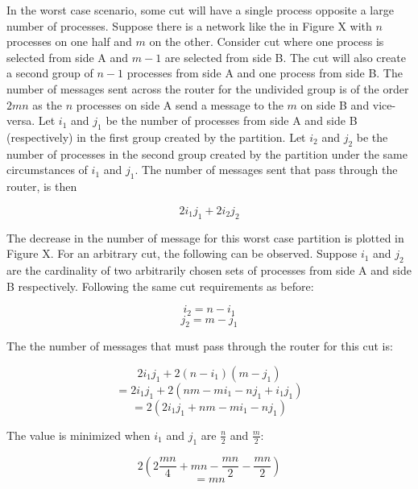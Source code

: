 In the worst case scenario, some cut will have a single process opposite a large number of processes.
Suppose there is a network like the in Figure X with $n$ processes on one half and $m$ on the other.
Consider cut where one process is selected from side A and $m-1$ are selected from side B.
The cut will also create a second group of $n-1$ processes from side A and one process from side B.
The number of messages sent across the router for the undivided group is of the order $2mn$ as the $n$ processes on side A send a message to the $m$ on side B and vice-versa.
Let $i_{1}$ and $j_{1}$ be the number of processes from side A and side B (respectively) in the first group created by the partition.
Let $i_{2}$ and $j_{2}$ be the number of processes in the second group created by the partition under the same circumstances of $i_1$ and $j_1$.
The number of messages sent that pass through the router, is then 

\begin{equation}
2 i_{1} j_{1} + 2 i_{2} j_{2}
\end{equation}

The decrease in the number of message for this worst case partition is plotted in Figure X.
For an arbitrary cut, the following can be observed.
Suppose $i_{1}$ and $j_{2}$ are the cardinality of two arbitrarily chosen sets of processes from side A and side B respectively.
Following the same cut requirements as before:

\begin{equation}
i_2 = n - i_1
\end{equation}
\begin{equation}
j_2 = m - j_1
\end{equation}

The the number of messages that must pass through the router for this cut is:

\begin{equation}
2 i_{1} j_{1} + 2 (n-i_{1}) (m-j_{1})
\end{equation}
\begin{equation}
= 2 i_{1} j_{1} + 2 (nm - mi_{1} - nj_{1} + i_{1}j_{1})
\end{equation}
\begin{equation}
= 2 (2 i_{1} j_{1} + nm - mi_{1} - nj_{1})
\end{equation}

The value is minimized when $i_1$ and $j_1$ are $\frac{n}{2}$ and $\frac{m}{2}$:

\begin{equation}
2( 2 \frac{mn}{4} + mn - \frac{mn}{2} - \frac{mn}{2})
\end{equation}
\begin{equation}
= mn
\end{equation}


